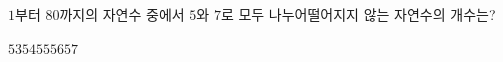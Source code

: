 \hspace*{2mm}\begin{minipage}[t]{\dimexpr\linewidth-2mm\relax}\vspace{0pt}
$1$부터 $80$까지의 자연수 중에서 $5$와 $7$로 모두 나누어떨어지지 않는 자연수의 개수는?
\begin{choices32}{$53$}{$54$}{$55$}{$56$}{$57$}\end{choices32}\end{minipage}

